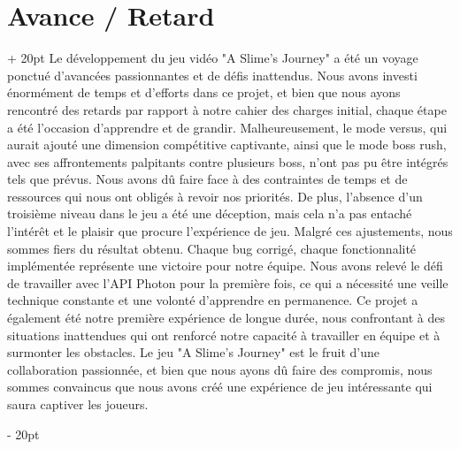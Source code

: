 \documentclass[a4paper, 12pt, twoside]{article}
\newcommand{\ind}[1][20pt]{\advance\leftskip + #1}
\newcommand{\deind}[1][20pt]{\advance\leftskip - #1}
\newenvironment{indt}[2][20pt]{#2 \par \ind[#1]}{\par \deind} %
\begin{document}
    \newpage

    \begin{indt}{\section{Avance / Retard}}
        Le développement du jeu vidéo "A Slime's Journey" a été un voyage ponctué d'avancées passionnantes et de défis inattendus. Nous avons investi énormément de temps et d'efforts dans ce projet, et bien que nous ayons rencontré des retards par rapport à notre cahier des charges initial, chaque étape a été l'occasion d'apprendre et de grandir. Malheureusement, le mode versus, qui aurait ajouté une dimension compétitive captivante, ainsi que le mode boss rush, avec ses affrontements palpitants contre plusieurs boss, n'ont pas pu être intégrés tels que prévus. Nous avons dû faire face à des contraintes de temps et de ressources qui nous ont obligés à revoir nos priorités. De plus, l'absence d'un troisième niveau dans le jeu a été une déception, mais cela n'a pas entaché l'intérêt et le plaisir que procure l'expérience de jeu. Malgré ces ajustements, nous sommes fiers du résultat obtenu. Chaque bug corrigé, chaque fonctionnalité implémentée représente une victoire pour notre équipe. Nous avons relevé le défi de travailler avec l'API Photon pour la première fois, ce qui a nécessité une veille technique constante et une volonté d'apprendre en permanence. Ce projet a également été notre première expérience de longue durée, nous confrontant à des situations inattendues qui ont renforcé notre capacité à travailler en équipe et à surmonter les obstacles. Le jeu "A Slime's Journey" est le fruit d'une collaboration passionnée, et bien que nous ayons dû faire des compromis, nous sommes convaincus que nous avons créé une expérience de jeu intéressante qui saura captiver les joueurs.
    \end{indt}
\end{document}
